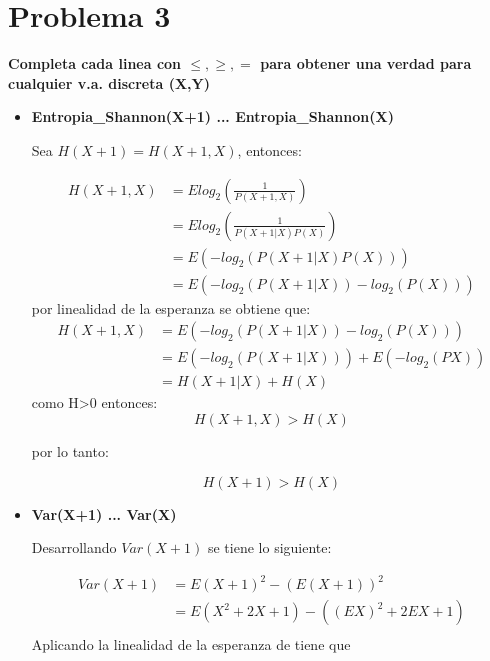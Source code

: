 \section*{Problema 3}

\textbf{Completa cada linea con $\leq , \geq, =$ para obtener una verdad para cualquier v.a. discreta (X,Y)}
\begin{itemize}
	\item \textbf{Entropia\_Shannon(X+1) ... Entropia\_Shannon(X)}

	      Sea $H(X+1)=H(X+1,X)$, entonces:

	      \begin{align*}
		      H(X+1,X) & = E log_2\left(\frac{1}{P(X+1,X)}\right)        \\
		               & = E log_2\left(\frac{1}{P(X+1|X)P(X)}\right)    \\
		               & = E\left(-log_2\left(P(X+1|X)P(X)\right)\right) \\
		               & =E\left(-log_2(P(X+1|X))-log_2(P(X))\right)
	      \end{align*}
	      por linealidad de la esperanza se obtiene que:
	      \begin{align*}
		      H(X+1,X) & =E\left(-log_2(P(X+1|X))-log_2(P(X))\right) \\
		               & =E(-log_2(P(X+1|X)))+E(-log_2(PX))          \\
		               & =H(X+1|X) + H(X)
	      \end{align*}
	      como H>0 entonces:
	      \begin{equation*}
		      H(X+1,X) > H(X)
	      \end{equation*}

	      por lo tanto:

	      \begin{equation*}
		      H(X+1) > H(X)
	      \end{equation*}
	\item \textbf{Var(X+1) ... Var(X)}

	      Desarrollando $Var(X+1)$ se tiene lo siguiente:

	      \begin{align*}
		      Var(X+1) & = E(X+1)^2-(E(X+1))^2         \\
		               & = E(X^2+2X+1)- ((EX)^2+2EX+1) \\
	      \end{align*}
	      Aplicando la linealidad de la esperanza de tiene que


\end{itemize}
